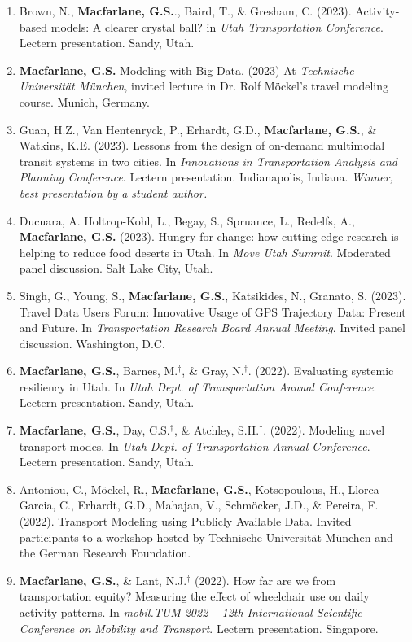 \documentclass[margin,line]{res}
\newcounter{enuminitialize}
\newenvironment{myenum}[1][]
{%
 \setcounter{enuminitialize}{#1}
 \addtocounter{enuminitialize}{2}
 \begin{enumerate}[left= 4pt, itemsep=8pt, start=\value{enuminitialize}, label=\arabic*\addtocounter{enumi}{-2}]
}
{%
 \end{enumerate}
}
\begin{document}
\begin{resume}
\begin{myenum}[45]
\item Brown, N., \textbf{Macfarlane, G.S.}., Baird, T., \& Gresham, C. (2023). Activity-based models: A clearer crystal ball? in \textit{Utah Transportation Conference}. Lectern presentation. Sandy, Utah.
\item \textbf{Macfarlane, G.S.} Modeling with Big Data. (2023) At \textit{Technische Universit\"at M\"unchen}, invited lecture in Dr. Rolf M\"ockel's travel modeling course. Munich, Germany.
\item Guan, H.Z., Van Hentenryck, P., Erhardt, G.D., \textbf{Macfarlane, G.S.}, \& Watkins, K.E. (2023). Lessons from the design of on-demand multimodal transit systems in two cities. In \textit{Innovations in Transportation Analysis and Planning Conference}. Lectern presentation. Indianapolis, Indiana. \textit{Winner, best presentation by a student author.}
\item Ducuara, A. Holtrop-Kohl, L., Begay, S., Spruance, L., Redelfs, A., \textbf{Macfarlane, G.S.} (2023). Hungry for change: how cutting-edge research is helping to reduce food deserts in Utah. In \textit{Move Utah Summit}. Moderated panel discussion. Salt Lake City, Utah.
\item Singh, G., Young, S., \textbf{Macfarlane, G.S.}, Katsikides, N., Granato, S. (2023). Travel Data Users Forum: Innovative Usage of GPS Trajectory Data: Present and Future. In \textit{Transportation Research Board Annual Meeting}. Invited panel discussion. Washington, D.C.
\item \textbf{Macfarlane, G.S.}, Barnes, M.$^\dagger$, \& Gray, N.$^\dagger$. (2022). Evaluating systemic resiliency in Utah. In \textit{Utah Dept. of Transportation Annual Conference}. Lectern presentation. Sandy, Utah.
\item \textbf{Macfarlane, G.S.}, Day, C.S.$^\dagger$, \& Atchley, S.H.$^\dagger$. (2022). Modeling novel transport modes. In \textit{Utah Dept. of Transportation Annual Conference}. Lectern presentation. Sandy, Utah.
\item Antoniou, C., M\"ockel, R., \textbf{Macfarlane, G.S.}, Kotsopoulous, H., Llorca-Garcia, C., Erhardt, G.D., Mahajan, V.,  Schm\"ocker, J.D., \& Pereira, F. (2022). Transport Modeling using Publicly Available Data. Invited participants to a workshop hosted by Technische Universit\"at M\"unchen and the German Research Foundation.
\item \textbf{Macfarlane, G.S.}, \& Lant, N.J.$^\dagger$ (2022). How far are we from transportation equity? Measuring the effect of wheelchair use on daily activity patterns. In \textit{mobil.TUM 2022 – 12th International Scientific Conference on Mobility and Transport}. Lectern presentation. Singapore.

\end{myenum}
\end{resume}
\end{document}
